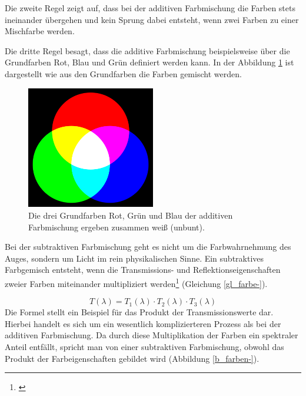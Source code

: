Die zweite Regel zeigt auf, dass bei der additiven Farbmischung die Farben stets ineinander übergehen und kein Sprung dabei entsteht, wenn zwei Farben zu einer Mischfarbe werden.

Die dritte Regel besagt, dass die additive Farbmischung beispielsweise über die Grundfarben Rot, Blau und Grün definiert werden kann. In der Abbildung   \ref{b_farben+} ist dargestellt wie aus den Grundfarben die Farben gemischt werden.

\begin{figure}[H]     %
\centering
\includegraphics[width=0.5\textwidth]{bilder/farben+} 
\caption {Die drei Grundfarben Rot, Grün und Blau der additiven Farbmischung ergeben zusammen weiß (unbunt).\protect\footnotemark}\label{b_farben+}
\end{figure}


Bei der subtraktiven Farbmischung geht es nicht um die Farbwahrnehmung des Auges, sondern um Licht im rein physikalischen Sinne. Ein subtraktives Farbgemisch entsteht, wenn die Transmissions- und Reflektionseigenschaften zweier Farben miteinander multipliziert werden\footnote{\cite[84]{greule}} (Gleichung \ref{gl_farbe-}).

\begin{equation}\label{gl_farbe-}
		T(\lambda) = T_{1}(\lambda) \cdot T_{2}(\lambda) \cdot T_{3}(\lambda)
	\end{equation}
Die Formel stellt ein Beispiel für das Produkt der Transmissionswerte dar.
Hierbei handelt es sich um ein wesentlich komplizierteren Prozess als bei der additiven Farbmischung. Da durch diese Multiplikation der Farben ein spektraler Anteil entfällt, spricht man von einer subtraktiven Farbmischung, obwohl das Produkt der Farbeigenschaften gebildet wird (Abbildung \ref{b_farben-}).

